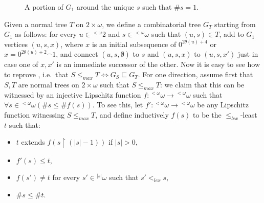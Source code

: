 \documentclass{amsart}
\theoremstyle{definition}
\theoremstyle{remark}
\begin{document}
\begin{figure}\usetikzlibrary{calc}
\caption{\label{G1}A portion of $G_1$ around the unique $s$ such that $\# s =1$.}
\end{figure}

Given a normal tree $T$ on $2 \times \omega$, we define a
combinatorial tree $G_T$ starting from $G_1$
as follows: for every $u \in {}^{< \omega}2$ and $s \in {{}^{<\omega}\omega}$
such that $(u,s) \in T$, add to $G_1$ vertices $(u,s,x)$, where $x$ is an
initial subsequence of
$0^{2 \theta(u)+4}$ or $x = 0^{2 \theta(u)+2} {}^\smallfrown 1$, and
connect $(u,s,\emptyset)$ to $s$ and $(u,s,x)$ to  $(u,s,x')$ just in
case one of $x,x'$ is an immediate successor of the other. Now it is
easy to see how to reprove \cite[Theorem 3.1]{louros}, i.e.\ that $S
\leq_{max} T  \iff G_S \sqsubseteq G_T$. For one
direction, assume first that $S,T$ are normal trees on $2 \times
\omega$ such that
$S \leq_{max} T$: we claim that this can be witnessed by an injective Lipschitz
function $f
\colon {{}^{<\omega}\omega} \to {{}^{<\omega}\omega}$ such that $\forall s\in {{}^{<\omega}\omega} (\#s \leq\# f(s))$. To
see this, let $f' \colon {{}^{<\omega}\omega} \to {{}^{<\omega}\omega}$ be any Lipschitz function
witnessing $S \leq_{max} T$, and define inductively $f(s)$ to be the
$\leq_{lex}$-least $t$ such that:

\begin{itemize}
\item $t$ extends $f(s\restriction (|s|-1))$ if $|s|>0$,
\item $f'(s) \leq t$,
\item $f(s')\neq t$ for every $s' \in {}^{|s|} \omega$ such that $s'<_{lex} s$,
\item $\# s \leq \# t$.
\end{itemize}
\end{document}
